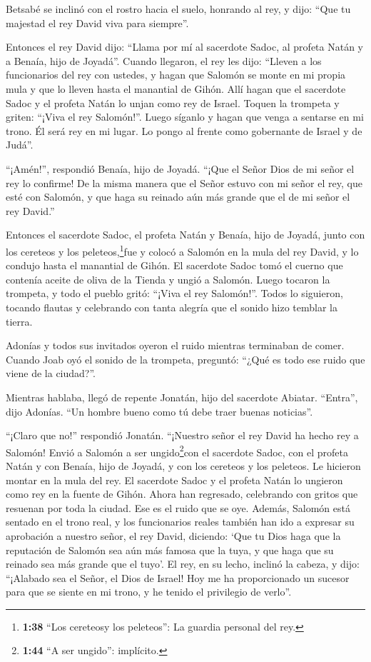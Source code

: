  Betsabé se inclinó con el rostro hacia el suelo, honrando
al rey, y dijo: ``Que tu majestad el rey David viva para siempre''.

 Entonces el rey David dijo: ``Llama por mí al sacerdote
Sadoc, al profeta Natán y a Benaía, hijo de Joyadá''. Cuando llegaron,
 el rey les dijo: ``Lleven a los funcionarios del rey con
ustedes, y hagan que Salomón se monte en mi propia mula y que lo lleven
hasta el manantial de Gihón.  Allí hagan que el sacerdote
Sadoc y el profeta Natán lo unjan como rey de Israel. Toquen la trompeta
y griten: ``¡Viva el rey Salomón!''.  Luego síganlo y hagan
que venga a sentarse en mi trono. Él será rey en mi lugar. Lo pongo al
frente como gobernante de Israel y de Judá''.

 ``¡Amén!'', respondió Benaía, hijo de Joyadá. ``¡Que el
Señor Dios de mi señor el rey lo confirme!  De la misma
manera que el Señor estuvo con mi señor el rey, que esté con Salomón, y
que haga su reinado aún más grande que el de mi señor el rey David.''

 Entonces el sacerdote Sadoc, el profeta Natán y Benaía,
hijo de Joyadá, junto con los cereteos y los peleteos,\footnote{\textbf{1:38}
  ``Los cereteosy los peleteos'': La guardia personal del rey.}fue y
colocó a Salomón en la mula del rey David, y lo condujo hasta el
manantial de Gihón.  El sacerdote Sadoc tomó el cuerno que
contenía aceite de oliva de la Tienda y ungió a Salomón. Luego tocaron
la trompeta, y todo el pueblo gritó: ``¡Viva el rey Salomón!''.
 Todos lo siguieron, tocando flautas y celebrando con tanta
alegría que el sonido hizo temblar la tierra.

 Adonías y todos sus invitados oyeron el ruido mientras
terminaban de comer. Cuando Joab oyó el sonido de la trompeta, preguntó:
``¿Qué es todo ese ruido que viene de la ciudad?''.

 Mientras hablaba, llegó de repente Jonatán, hijo del
sacerdote Abiatar. ``Entra'', dijo Adonías. ``Un hombre bueno como tú
debe traer buenas noticias''.

 ``¡Claro que no!'' respondió Jonatán. ``¡Nuestro señor el
rey David ha hecho rey a Salomón!  Envió a Salomón a ser
ungido\footnote{\textbf{1:44} ``A ser ungido'': implícito.}con el
sacerdote Sadoc, con el profeta Natán y con Benaía, hijo de Joyadá, y
con los cereteos y los peleteos. Le hicieron montar en la mula del rey.
 El sacerdote Sadoc y el profeta Natán lo ungieron como rey
en la fuente de Gihón. Ahora han regresado, celebrando con gritos que
resuenan por toda la ciudad. Ese es el ruido que se oye. 
Además, Salomón está sentado en el trono real,  y los
funcionarios reales también han ido a expresar su aprobación a nuestro
señor, el rey David, diciendo: `Que tu Dios haga que la reputación de
Salomón sea aún más famosa que la tuya, y que haga que su reinado sea
más grande que el tuyo'. El rey, en su lecho, inclinó la cabeza,
 y dijo: ``¡Alabado sea el Señor, el Dios de Israel! Hoy me
ha proporcionado un sucesor para que se siente en mi trono, y he tenido
el privilegio de verlo''.

